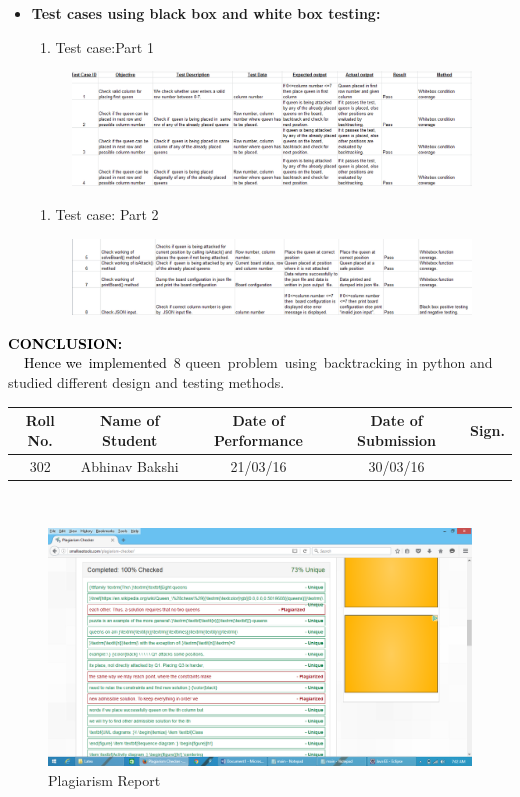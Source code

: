 \documentclass[a4paper,12pt]{article}
\begin{document}
\begin{itemize}
\newpage
\item \textbf{Test cases using black box and white box testing:}
\begin{enumerate}
\item Test case:Part 1
\end{enumerate}
\begin{figure}[h!]
		\centering
		\includegraphics[scale=0.5]{queentest1.png}
	\end{figure}
    
\begin{enumerate}
\item Test case: Part 2
\end{enumerate}

\begin{figure}[h!]
		\centering
		\includegraphics[scale=0.5]{queentest2.png}
	\end{figure}
\end{itemize}
\bigskip

{\sffamily
\textrm{\textbf{\textcolor{black}{CONCLUSION:\ }}}}\\

{\sffamily
\textrm{\textbf{\textcolor{black}{\ \ }}}\textrm{\textcolor{black}{Hence we\ implemented}}\textrm{\ 8
queen\ problem\ using\ backtracking in python and studied different design and testing methods.}}

\begin{center}
\begin{tabular}
{|c|c|c|c|c|}\hline
{\bf Roll No.}		&{\bf Name of Student}	&{\bf Date of Performance}  				&{\bf Date of Submission}	&{\bf Sign.}  \\    \hline
{302}	&	{Abhinav Bakshi}& 	{21/03/16}	&  {30/03/16} \\ \hline
\end{tabular}\\ 
\end{center}	

\begin{figure}[htb!]
	\centering
	\includegraphics[scale = 0.75]{b6_8queen.png}
	\caption{Plagiarism Report }
	\label{Plagiarism Report}
\end{figure}
\end{document}
